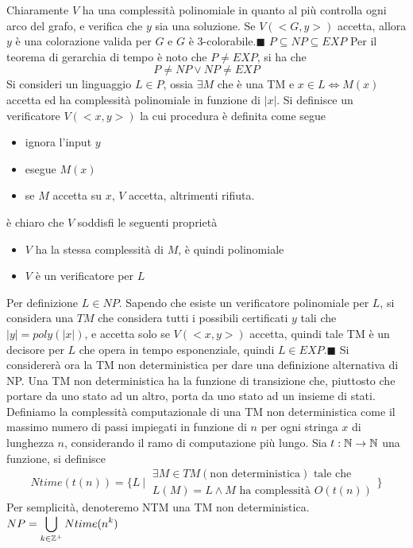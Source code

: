 \documentclass[10pt, letterpaper]{report}
\begin{document}
Chiaramente $V$ ha una complessità polinomiale in quanto al più controlla ogni arco del grafo, e verifica che $y$ sia una soluzione. Se $V(<G,y>)$ accetta, allora $y$ è una colorazione valida per $G$ e $G$ è 3-colorabile.\hfill$\blacksquare$\acc  
\teo{} $P\subseteq NP \subseteq EXP$
\acc\dimo{}
Per il teorema di gerarchia di tempo è noto che $P\ne EXP$, si ha che 
$$ P\ne NP \lor NP \ne EXP$$
Si consideri un linguaggio $L\in P$, ossia $\exists M$ che è una TM e $x\in L \iff M(x)$ accetta ed ha complessità polinomiale in funzione di $|x|$. Si definisce un verificatore $V(<x,y>)$ la cui procedura è definita come segue\begin{itemize}
    \item ignora l'input $y$
    \item esegue $M(x)$
    \item se $M$ accetta su $x$, $V$ accetta, altrimenti rifiuta.
\end{itemize}
è chiaro che $V$ soddisfi le seguenti proprietà 
\begin{itemize}
    \item $V$ ha la stessa complessità di $M$, è quindi polinomiale 
    \item $V$ è un verificatore per $L$
\end{itemize}
Per definizione $L\in NP$. Sapendo che esiste un verificatore polinomiale per $L$, si considera una $TM$ che considera tutti i possibili certificati $y$ tali che $|y|=poly(|x|)$, e accetta solo se $V(<x,y>)$ accetta, quindi tale TM è un decisore per $L$ che opera in tempo esponenziale, quindi $L\in EXP$.\hfill$\blacksquare$\acc  
Si considererà ora la TM non deterministica per dare una definizione alternativa di NP. Una TM non deterministica ha la funzione di transizione che, piuttosto che portare da uno stato ad un altro, porta da uno stato ad un insieme di stati. \acc 
Definiamo la complessità computazionale di una TM non deterministica come il massimo numero di passi impiegati in funzione di $n$ per ogni stringa $x$ di lunghezza $n$, considerando il ramo di computazione più lungo.\acc 
{}  Sia $t:{\mathbb N}\rightarrow {\mathbb N}$ una funzione, si definisce 
$$ Ntime(t(n))=\Bigg\{L \ |\ \begin{matrix}\exists M \in TM(\text{non deterministica}) \text{ tale che }\\ L(M)=L\land M\text{ ha complessità }O(t(n))\end{matrix}\Bigg\}$$
Per semplicità, denoteremo NTM una TM non deterministica.\acc 
{} $\displaystyle NP=\bigcup_{k\in{\mathbb Z}^+}Ntime(n^k)$
\acc 
\end{document}
